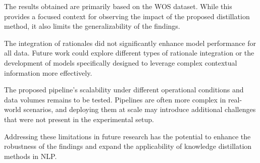 The results obtained are primarily based on the WOS dataset. While this provides a focused context for observing the impact of the proposed distillation method, it also limits the generalizability of the findings.

The integration of rationales did not significantly enhance model performance for all data. Future work could explore different types of rationale integration or the development of models specifically designed to leverage complex contextual information more effectively.

The proposed pipeline's scalability under different operational conditions and data volumes remains to be tested. Pipelines are often more complex in real-world scenarios, and deploying them at scale may introduce additional challenges that were not present in the experimental setup.

Addressing these limitations in future research has the potential to enhance the robustness of the findings and expand the applicability of knowledge distillation methods in NLP\@.
